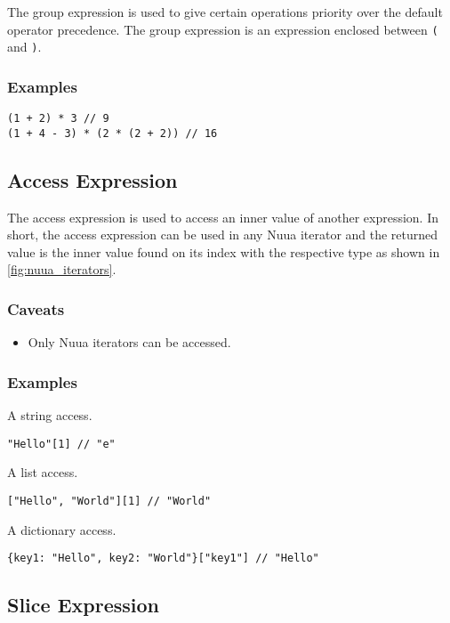 The group expression is used to give certain operations priority over the default operator precedence.
The group expression is an expression enclosed between \texttt{(} and \texttt{)}.

\subsubsection{Examples}

\begin{verbatim}
(1 + 2) * 3 // 9
(1 + 4 - 3) * (2 * (2 + 2)) // 16
\end{verbatim}

\subsection{Access Expression}

The access expression is used to access an inner value of another expression. In short, the access expression can be used in any
Nuua iterator and the returned value is the inner value found on its index with the respective type as shown in \autoref{fig:nuua_iterators}.

\subsubsection{Caveats}

\begin{itemize}
    \item Only Nuua iterators can be accessed.
\end{itemize}

\subsubsection{Examples}

A string access.
\begin{verbatim}
"Hello"[1] // "e"
\end{verbatim}
A list access.
\begin{verbatim}
["Hello", "World"][1] // "World"
\end{verbatim}
A dictionary access.
\begin{verbatim}
{key1: "Hello", key2: "World"}["key1"] // "Hello"
\end{verbatim}

\subsection{Slice Expression}

